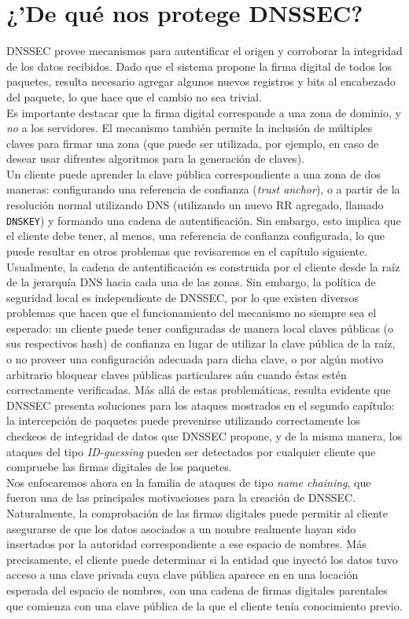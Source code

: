\chapter{¿'De qu\'e nos protege DNSSEC?}
DNSSEC provee mecanismos para autentificar el origen y corroborar la integridad de los datos recibidos. Dado que el sistema propone la firma digital de todos los paquetes, resulta necesario agregar algunos nuevos registros y bits al encabezado del paquete, lo que hace que el cambio no sea trivial.\\
Es importante destacar que la firma digital corresponde a una zona de dominio, y \textit{no} a los servidores. El mecanismo tambi\'en permite la inclusi\'on de m\'ultiples claves para firmar una zona (que puede ser utilizada, por ejemplo, en caso de desear usar difrentes algoritmos para la generaci\'on de claves).\\
Un cliente puede aprender la clave p\'ublica correspondiente a una zona de dos maneras: configurando una referencia de confianza (\textit{trust anchor}), o a partir de la resoluci\'on normal utilizando DNS (utilizando un nuevo RR agregado, llamado \texttt{DNSKEY}) y formando una cadena de autentificaci\'on. Sin embargo, esto implica que el cliente debe tener, al menos, una referencia de confianza configurada, lo que puede resultar en otros problemas que revisaremos en el cap\'itulo siguiente.\\
Usualmente, la cadena de autentificaci\'on es construida por el cliente desde la ra\'iz de la jerarqu\'ia DNS hacia cada una de las zonas. Sin embargo, la pol\'itica de seguridad local es independiente de DNSSEC, por lo que existen diversos problemas que hacen que el funcionamiento del mecanismo no siempre sea el esperado: un cliente puede tener configuradas de manera local claves p\'ublicas (o sus respectivos hash) de confianza en lugar de utilizar la clave p\'ublica de la ra\'iz, o no proveer una configuraci\'on adecuada para dicha clave, o por alg\'un motivo arbitrario bloquear claves p\'ublicas particulares a\'un cuando \'estas est\'en correctamente verificadas.
M\'as all\'a de estas problem\'aticas, resulta evidente que DNSSEC presenta soluciones para los ataques mostrados en el segundo cap\'itulo: la intercepci\'on de paquetes puede prevenirse utilizando correctamente los checkeos de integridad de datos que DNSSEC propone, y de la misma manera, los ataques del tipo \textit{ID-guessing} pueden ser detectados por cualquier cliente que compruebe las firmas digitales de los paquetes.\\
Nos enfocaremos ahora en la familia de ataques de tipo \textit{name chaining}, que fueron una de las principales motivaciones para la creaci\'on de DNSSEC. Naturalmente, la comprobaci\'on de las firmas digitales puede permitir al cliente asegurarse de que los datos asociados a un nombre realmente hayan sido insertados por la autoridad correspondiente a ese espacio de nombres. M\'as precisamente, el cliente puede determinar si la entidad que inyect\'o los datos tuvo acceso a una clave privada cuya clave p\'ublica aparece en en una locaci\'on esperada del espacio de nombres, con una cadena de firmas digitales parentales que comienza con una clave p\'ublica de la que el cliente ten\'ia conocimiento previo.\\
